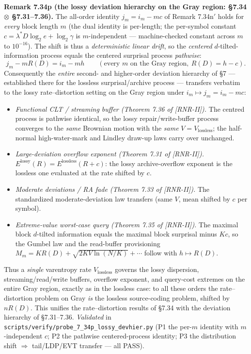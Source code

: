 \documentclass[
]{article}
\begin{document}
\textbf{Remark 7.34p (the lossy deviation hierarchy on the Gray region: §7.34
$\otimes$ §7.31--7.36).} The all-order identity $j_m=i_m-mc$ of Remark 7.34n$'$
holds for \emph{every} block length $m$ (the dual identity is per-length; the
per-symbol constant $c=\lambda^*D\log_2 e+\log_2\gamma$ is $m$-independent ---
machine-checked constant across $m$ to $10^{-16}$). The shift is thus a
\emph{deterministic linear drift}, so the \emph{centered} $d$-tilted-information
process equals the centered surprisal process \emph{pathwise}:
\[
  j_m-mR(D)=i_m-mh\qquad(\text{every }m\text{ on the Gray region},\ R(D)=h-c).
\]
Consequently the \emph{entire} second- and higher-order deviation hierarchy of §7
--- established there for the lossless surprisal/archive process --- transfers
verbatim to the lossy rate--distortion setting on the Gray region under
$i_m\mapsto j_m=i_m-mc$:
\begin{itemize}
\item \emph{Functional CLT / streaming buffer (Theorem 7.36 of [RNR-II]).} The centred
process is pathwise identical, so the lossy repair/write-buffer process converges
to the \emph{same} Brownian motion with the \emph{same} $V=V_{\mathrm{lossless}}$;
the half-normal high-water-mark and Lindley draw-up laws carry over unchanged.
\item \emph{Large-deviation overflow exponent (Theorem 7.31 of [RNR-II]).}
$E^{\mathrm{lossy}}(R)=E^{\mathrm{lossless}}(R+c)$: the lossy archive-overflow
exponent is the lossless one evaluated at the rate shifted by $c$.
\item \emph{Moderate deviations / RA fade (Theorem 7.33 of [RNR-II]).} The standardized
moderate-deviation law transfers (same $V$, mean shifted by $c$ per symbol).
\item \emph{Extreme-value worst-case query (Theorem 7.35 of [RNR-II]).} The maximal block
$d$-tilted information equals the maximal block surprisal minus $Kc$, so the
Gumbel law and the read-buffer provisioning $M_m=KR(D)+\sqrt{2KV\ln(N/K)}+\cdots$
follow with $h\mapsto R(D)$.
\end{itemize}
Thus a \emph{single} varentropy rate $V_{\mathrm{lossless}}$ governs the lossy
dispersion, streaming/read/write buffers, overflow exponent, and query-cost
extremes on the entire Gray region, exactly as in the lossless case: to all these
orders the rate--distortion problem on Gray \emph{is} the lossless source-coding
problem, shifted by $nR(D)$. This unifies the rate--distortion results of §7.34
with the deviation hierarchy of §7.31--7.36. \emph{Validated} in
\texttt{scripts/verify/probe\_7\_34p\_lossy\_devhier.py} (P1 the per-$m$ identity
with $m$-independent $c$; P2 the pathwise centered-process identity; P3 the
distribution shift $\Rightarrow$ tail/LDP/EVT transfer --- all PASS).
\end{document}
